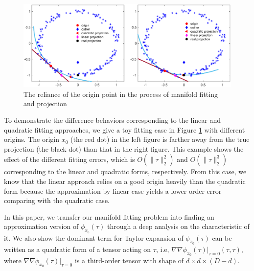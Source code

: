 \documentclass{article}
\theoremstyle{remark}
\begin{document}
\begin{figure}[t!] %
   \centering
   \includegraphics[width=\linewidth]{democ3.eps} 
   \vspace{-0.4cm}
   \caption{The reliance of the origin point in the process of manifold fitting and projection}
   \label{Comparison}
\end{figure}
To demonstrate the difference behaviors corresponding to the linear and quadratic fitting approaches, we give a toy fitting case in Figure \ref{Comparison} with different origins. The origin $x_0$ (the red dot) in the left figure is farther away from the true projection (the black dot) than that in the right figure.  This example shows the effect of the different fitting errors, which is $O(\|\tau\|_2^2)$ and $O(\|\tau\|_2^3)$ corresponding to the linear and quadratic forms, respectively. From this case, we know that the linear approach relies on a good origin heavily than the quadratic form because the approximation by linear case yields a lower-order error comparing with the quadratic case.
 

In this paper, we transfer our manifold fitting problem into finding an approximation version of $\phi_{x_0}(\tau)$ through a deep analysis on the characteristic of it. We also show the dominant term for Taylor expansion of $\phi_{x_0}(\tau)$ can be written as a quadratic form of a tensor acting on $\tau$, i.e, $\nabla\nabla \phi_{x_0}(\tau)|_{\tau=0}(\tau,\tau)$, where $\nabla\nabla\phi_{x_0}(\tau)|_{\tau=0}$ is a third-order tensor with shape of $d\times d\times (D-d)$.  
\end{document}
